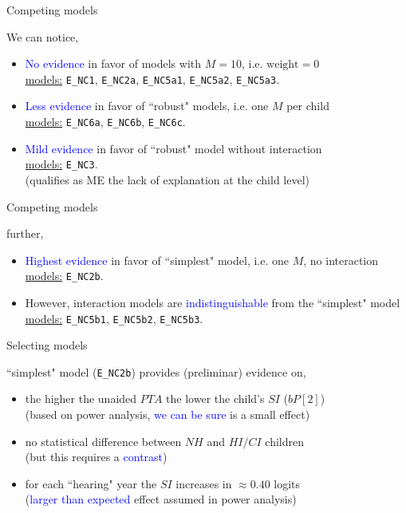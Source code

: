 %
%
\begin{lhframe}[rhgraphic={\texttt{[image: models\_table.png]}}]
	{Competing models}
	
	We can notice,
	\begin{itemize}
		\item \textcolor{blue}{No evidence} in favor of models with $M=10$, i.e. $\text{weight}=0$ \\
		\underline{models:} \texttt{E\_NC1}, \texttt{E\_NC2a}, \texttt{E\_NC5a1}, \texttt{E\_NC5a2}, \texttt{E\_NC5a3}. 
		\item \textcolor{blue}{Less evidence} in favor of ``robust" models, i.e. one $M$ per child \\
		\underline{models:} \texttt{E\_NC6a}, \texttt{E\_NC6b}, \texttt{E\_NC6c}. 
		\item \textcolor{blue}{Mild evidence} in favor of ``robust" model without interaction \\
		\underline{models:} \texttt{E\_NC3}. \\
		{\small (qualifies as ME the lack of explanation at the child level)} \\
	\end{itemize}
\end{lhframe}
%
%
\begin{lhframe}[rhgraphic={\texttt{[image: models\_table.png]}}]
	{Competing models}
	
	further,
	\begin{itemize}
		\item \textcolor{blue}{Highest evidence} in favor of ``simplest" model, i.e. one $M$, no interaction \\ 
		\underline{models:} \texttt{E\_NC2b}.
		\item However, interaction models are \textcolor{blue}{indistinguishable} from the ``simplest" model \\
		\underline{models:} \texttt{E\_NC5b1}, \texttt{E\_NC5b2}, \texttt{E\_NC5b3}.
	\end{itemize}
\end{lhframe}
%
%
\begin{lhframe}[rhgraphic={\texttt{[image: select\_model1.png]}}]
	{Selecting models}
	
	``simplest" model (\texttt{E\_NC2b}) provides (preliminar) evidence on,
	\begin{itemize}
		\item the higher the unaided $PTA$ the lower the child's $SI$ ($bP[2]$)\\
		{\small (based on power analysis, \textcolor{blue}{we can be sure} is a small effect) }
		\item no statistical difference between $NH$ and $HI/CI$ children \\
		{\small (but this requires a \textcolor{blue}{contrast}) }
		\item for each ``hearing" year the $SI$ increases in $\approx 0.40$ logits \\
		{\small (\textcolor{blue}{larger than expected} effect assumed in power analysis) }
	\end{itemize}
\end{lhframe}
